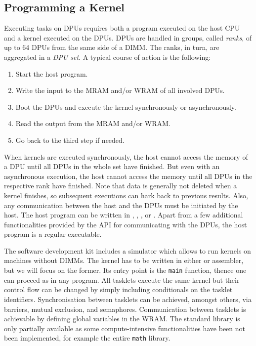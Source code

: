 \subsection{Programming a Kernel}
\label{sec:prereq:arch:code}

Executing tasks on \acp{DPU} requires both a program executed on the host \ac{CPU} and a kernel executed on the \acp{DPU}.
\Acp{DPU} are handled in groups, called \emph{ranks}, of up to 64 \acp{DPU} from the same side of a \ac{DIMM}.
The ranks, in turn, are aggregated in a \emph{\ac{DPU} set}.
A typical course of action is the following:
\begin{enumerate}
	\item
	Start the host program.

	\item
	Write the input to the \ac{MRAM} and/or \ac{WRAM} of all involved \acp{DPU}.

	\item
	Boot the \acp{DPU} and execute the kernel synchronously or asynchronously.

	\item
	Read the output from the \ac{MRAM} and/or \ac{WRAM}.

	\item
	Go back to the third step if needed.
\end{enumerate}
When kernels are executed synchronously, the host cannot access the memory of a \ac{DPU} until all \acp{DPU} in the whole set have finished.
But even with an asynchronous execution, the host cannot access the memory until all \acp{DPU} in the respective rank have finished.
Note that data is generally not deleted when a kernel finishes, so subsequent executions can hark back to previous results.
Also, any communication between the host and the \acp{DPU} must be initiated by the host.
The host program can be written in \langC{}, \langCpp{}, \langJava{}, or \langPython{}.
Apart from a few additional functionalities provided by the \upmem{} \ac{API} for communicating with the \acp{DPU}, the host program is a regular executable.

The software development kit includes a simulator which allows to run kernels on machines without \upmem{} \acp{DIMM}.
The kernel has to be written in either \langC{} or assembler, but we will focus on the former.
Its entry point is the \lstinline|main| function, thence one can proceed as in any \langC{} program.
All tasklets execute the same kernel but their control flow can be changed by simply including conditionals on the tasklet identifiers.
Synchronisation between tasklets can be achieved, amongst others, via barriers, mutual exclusion, and semaphores.
Communication between tasklets is achievable by defining global variables in the \ac{WRAM}.
The \langC{} standard library is only partially available as some compute-intensive functionalities have been not been implemented, for example the entire \lstinline|math| library.

